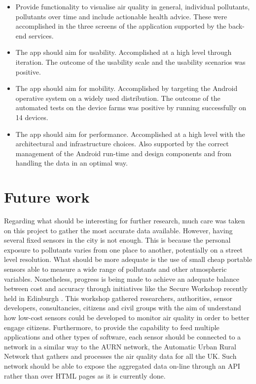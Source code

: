 \begin{itemize}
	\item Provide functionality to visualise air quality in general, individual pollutants, pollutants over time and include actionable health advice. These were accomplished in the three screens of the application supported by the back-end services.
	\item The app should aim for usability. Accomplished at a high level through iteration. The outcome of the usability scale and the usability scenarios was positive. 
    \item The app should aim for mobility. Accomplished by targeting the Android operative system on a widely used distribution. The outcome of the automated tests on the device farms was positive by running successfully on 14 devices.
    \item The app should aim for performance. Accomplished at a high level with the architectural and infrastructure choices. Also supported by the correct management of the Android run-time and design components and from handling the data in an optimal way. 
\end{itemize}

\section{Future work}
Regarding what should be interesting for further research, much care was taken on this project to gather the most accurate data available. However, having several fixed sensors in the city is not enough. This is because the personal exposure to pollutants varies from one place to another, potentially on a street level resolution. What should be more adequate is the use of small cheap portable sensors able to measure a wide range of pollutants and other atmospheric variables. Nonetheless, progress is being made to achieve an adequate balance between cost and accuracy through initiatives like the Secure Workshop recently held in Edinburgh \cite{SecureWorkshop2016}. This workshop gathered researchers, authorities, sensor developers, consultancies, citizens and civil groups with the aim of understand how low-cost sensors could be developed to monitor air quality in order to better engage citizens. Furthermore, to provide the capability to feed multiple applications and other types of software, each sensor should be connected to a network in a similar way to the AURN network, the Automatic Urban Rural Network that gathers and processes the air quality data for all the UK. Such network should be able to expose the aggregated data on-line through an API rather than over HTML pages as it is currently done.


